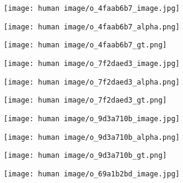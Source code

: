 \documentclass[10pt,twocolumn,letterpaper]{article}
\begin{document}
\begin{figure*}
\centering
  \begin{subfigure}{0.16\linewidth}
    \centerline{\texttt{[image: human image/o\_4faab6b7\_image.jpg]}}
    \label{fig:a_image}
  \end{subfigure}
  \centering
  \begin{subfigure}{0.16\linewidth}
    \centerline{\texttt{[image: human image/o\_4faab6b7\_alpha.png]}}
    \label{fig:a_alpha}
  \end{subfigure}
    \centering
  \begin{subfigure}{0.16\linewidth}
    \centerline{\texttt{[image: human image/o\_4faab6b7\_gt.png]}}
    \label{fig:a_gt}
  \end{subfigure}
\centering
  \begin{subfigure}{0.16\linewidth}
    \centerline{\texttt{[image: human image/o\_7f2daed3\_image.jpg]}}
    \label{fig:b_image}
  \end{subfigure}
  \centering
  \begin{subfigure}{0.16\linewidth}
    \centerline{\texttt{[image: human image/o\_7f2daed3\_alpha.png]}}
    \label{fig:b_alpha}
  \end{subfigure}
  \centering
  \begin{subfigure}{0.16\linewidth}
    \centerline{\texttt{[image: human image/o\_7f2daed3\_gt.png]}}
    \label{fig:b_gt}
  \end{subfigure}
\centering
  \begin{subfigure}{0.16\linewidth}
    \centerline{\texttt{[image: human image/o\_9d3a710b\_image.jpg]}}
    \label{fig:c_image}
  \end{subfigure}
  \centering
  \begin{subfigure}{0.16\linewidth}
    \centerline{\texttt{[image: human image/o\_9d3a710b\_alpha.png]}}
    \label{fig:c_alpha}
  \end{subfigure}
  \centering
  \begin{subfigure}{0.16\linewidth}
    \centerline{\texttt{[image: human image/o\_9d3a710b\_gt.png]}}
    \label{fig:c_gt}
  \end{subfigure}
\centering
  \begin{subfigure}{0.16\linewidth}
    \centerline{\texttt{[image: human image/o\_69a1b2bd\_image.jpg]}}
    \label{fig:f_image}
  \end{subfigure}

\end{figure*}
\end{document}
